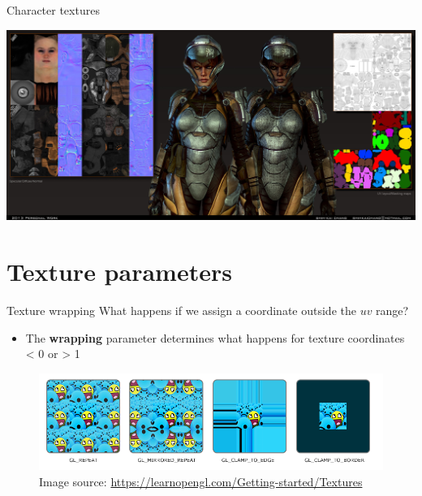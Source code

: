 \begin{frame}{Character textures}
	\begin{center}
		\includegraphics[width=\textwidth]{character_texture}
	\end{center}
\end{frame}

\part{Texture parameters}
\frame{\partpage}

\begin{frame}{Texture wrapping}
	What happens if we assign a coordinate outside the $uv$ range?
	\begin{itemize}
		\pause\item The \textbf{wrapping} parameter determines what happens for texture coordinates < 0 or > 1
	\end{itemize}
	\begin{figure}[h!]
		\pause\includegraphics[width=\textwidth]{texture_wrapping}
		\caption*{Image source: \url{https://learnopengl.com/Getting-started/Textures}}
	\end{figure}
\end{frame}

